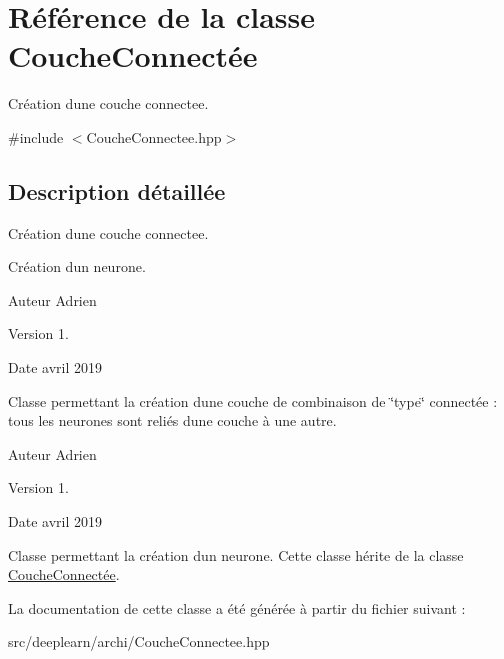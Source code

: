 \hypertarget{class_couche_connect_xC3_xA9e}{}\section{Référence de la classe Couche\+Connectée}
\label{class_couche_connect_xC3_xA9e}


Création d\textquotesingle{}une couche connectee.  




{\ttfamily \#include $<$Couche\+Connectee.\+hpp$>$}



\subsection{Description détaillée}
Création d\textquotesingle{}une couche connectee. 

Création d\textquotesingle{}un neurone.

\begin{DoxyAuthor}{Auteur}
Adrien 
\end{DoxyAuthor}
\begin{DoxyVersion}{Version}
1. 
\end{DoxyVersion}
\begin{DoxyDate}{Date}
avril 2019
\end{DoxyDate}
Classe permettant la création d\textquotesingle{}une couche de combinaison de \char`\"{}type\char`\"{} connectée \+: tous les neurones sont reliés d\textquotesingle{}une couche à une autre.

\begin{DoxyAuthor}{Auteur}
Adrien 
\end{DoxyAuthor}
\begin{DoxyVersion}{Version}
1. 
\end{DoxyVersion}
\begin{DoxyDate}{Date}
avril 2019
\end{DoxyDate}
Classe permettant la création d\textquotesingle{}un neurone. Cette classe hérite de la classe \hyperlink{class_couche_connect_xC3_xA9e}{Couche\+Connectée}. 

La documentation de cette classe a été générée à partir du fichier suivant \+:\begin{DoxyCompactItemize}
\item 
src/deeplearn/archi/Couche\+Connectee.\+hpp\end{DoxyCompactItemize}
